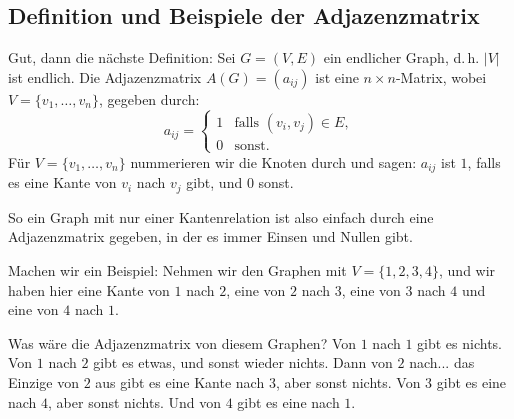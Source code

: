 \subsection{Definition und Beispiele der Adjazenzmatrix}

\begin{spoken-clean}[00:25:32 - 00:28:49]
Gut, dann die nächste Definition: Sei $G = (V, E)$ ein endlicher Graph, d.\,h. $|V|$ ist endlich. Die Adjazenzmatrix $A(G) = (a_{ij})$ ist eine $n \times n$-Matrix, wobei $V = \{v_1, \dots, v_n\}$, gegeben durch:
\[
a_{ij} = \begin{cases} 1 & \text{falls } (v_i, v_j) \in E, \\ 0 & \text{sonst.} \end{cases}
\]
Für $V = \{v_1, \dots, v_n\}$ nummerieren wir die Knoten durch und sagen: $a_{ij}$ ist $1$, falls es eine Kante von $v_i$ nach $v_j$ gibt, und $0$ sonst.

So ein Graph mit nur einer Kantenrelation ist also einfach durch eine Adjazenzmatrix gegeben, in der es immer Einsen und Nullen gibt.
\end{spoken-clean}

\begin{spoken-clean}[00:28:49 - 00:30:10]
Machen wir ein Beispiel: Nehmen wir den Graphen mit $V = \{1, 2, 3, 4\}$, und wir haben hier eine Kante von $1$ nach $2$, eine von $2$ nach $3$, eine von $3$ nach $4$ und eine von $4$ nach $1$.

Was wäre die Adjazenzmatrix von diesem Graphen? Von $1$ nach $1$ gibt es nichts. Von $1$ nach $2$ gibt es etwas, und sonst wieder nichts. Dann von $2$ nach... das Einzige von $2$ aus gibt es eine Kante nach $3$, aber sonst nichts. Von $3$ gibt es eine nach $4$, aber sonst nichts. Und von $4$ gibt es eine nach $1$.
\end{spoken-clean}

